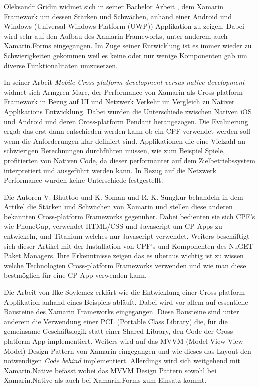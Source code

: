 Oleksandr Gridin widmet sich in seiner Bachelor Arbeit \cite{Oleksandr2015}, dem Xamarin Framework um dessen Stärken und Schwächen, anhand einer Android und Windows (Universal Windows Platform (UWP)) Applikation zu zeigen. Dabei wird sehr auf den Aufbau des Xamarin Frameworks, unter anderem auch Xamarin.Forms eingegangen. Im Zuge seiner Entwicklung ist es immer wieder zu Schwierigkeiten gekommen weil es keine oder nur wenige Komponenten gab um diverse Funktionalitäten umzusetzen.

In seiner Arbeit \cite{Armgren852125} \textit{Mobile Cross-platform development versus native development} widmet sich Armgren Marc, der  Performance von Xamarin als Cross-platform Framework in Bezug auf UI und Netzwerk Verkehr im Vergleich zu Nativer Applikations Entwicklung. Dabei wurden die Unterschiede zwischen Nativen iOS und Android und deren Cross-platform Pendant herangezogen. Die Evaluierung ergab das erst dann entschieden werden kann ob ein CPF verwendet werden soll wenn die Anforderungen klar definiert sind. Applikationen die eine Vielzahl an schwierigen Berechnungen durchführen müssen, wie zum Beispiel Spiele, profitierten von Nativen Code, da dieser performanter auf dem Zielbetriebssystem interpretiert und ausgeführt werden kann. In Bezug auf die Netzwerk Performance wurden keine Unterschiede festgestellt. 

Die Autoren V. Bhuttoo und K. Soman und R. K. Sungkur behandeln in dem Artikel \cite{8016193} die Stärken und Schwächen von Xamarin und stellen diese anderen bekannten Cross-platform Frameworks gegenüber. Dabei bedienten sie sich CPF's wie PhoneGap, verwendet HTML/CSS und Javascript um CP Apps zu entwickeln, und Titanium welches nur Javascript verwendet. Weiters beschäftigt sich dieser Artikel mit der Installation von CPF's und Komponenten des NuGET Paket Managers. Ihre Erkenntnisse zeigen das es überaus wichtig ist zu wissen welche Technologien Cross-platform Frameworks verwenden und wie man diese bestmöglich für eine CP App verwenden kann.

Die Arbeit von Ilke Soylemez \cite{Mukesh2016} erklärt wie die Entwicklung einer Cross-platform Applikation anhand eines Beispiels abläuft. Dabei wird vor allem auf essentielle Bausteine des Xamarin Frameworks eingegangen. Diese Bausteine sind unter anderem die Verwendung einer PCL (Portable Class Library) die, für die gemeinsame Geschäftslogik statt einer Shared Library, den Code der Cross-platform App implementiert. Weiters wird auf das MVVM (Model View View Model) Design Pattern von Xamarin eingegangen und wie dieses das Layout den notwendigen \textit{Code behind} implementiert. Allerdings wird sich weitgehend mit Xamarin.Native befasst wobei das MVVM Design Pattern sowohl bei Xamarin.Native als auch bei Xamarin.Forms zum Einsatz kommt.

